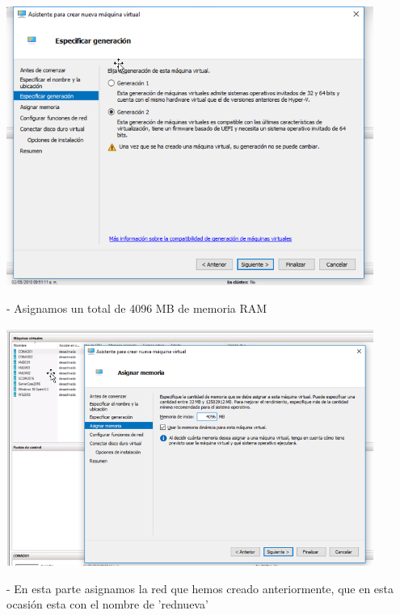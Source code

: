 \documentclass[12pt,letterpaper]{article}
\begin{document}
\begin{center}
	\includegraphics[width=12cm]{./Imagenes/8} 
\end{center}



\begin{itemize}
- Asignamos un total de 4096 MB de memoria RAM\\
\end{itemize}

\begin{center}
	\includegraphics[width=12cm]{./Imagenes/9} 
\end{center}


\begin{itemize}
- En esta parte asignamos la red que hemos creado anteriormente, que en esta ocasión esta con el nombre de 'rednueva'\\
\end{itemize}
\end{document}
